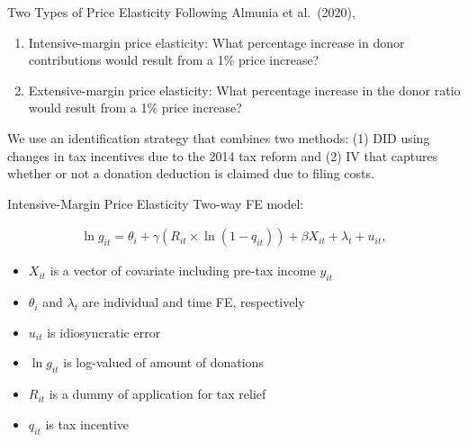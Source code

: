\documentclass[
  ignorenonframetext,
  aspectratio=169,
]{beamer}
\providecommand{\tightlist}{%
  \setlength{\itemsep}{0pt}\setlength{\parskip}{0pt}}
\begin{document}
\begin{frame}{Two Types of Price Elasticity}
\protect\hypertarget{two-types-of-price-elasticity}{}
Following Almunia et al.~(2020),

\begin{enumerate}
\tightlist
\item
  Intensive-margin price elasticity: What percentage increase in donor contributions would result from a 1\% price increase?
\item
  Extensive-margin price elasticity: What percentage increase in the donor ratio would result from a 1\% price increase?
\end{enumerate}

We use an identification strategy that combines two methods:
(1) DID using changes in tax incentives due to the 2014 tax reform and
(2) IV that captures whether or not a donation deduction is claimed due to filing costs.
\end{frame}

\begin{frame}{Intensive-Margin Price Elasticity}
\protect\hypertarget{intensive-margin-price-elasticity}{}
Two-way FE model:

\begin{align}
  \ln g_{it} = \theta_i + \gamma (R_{it} \times \ln (1 - q_{it}))
    + \beta X_{it} + \lambda_t + u_{it}, \label{eq:intensive}
\end{align}

\begin{itemize}
\tightlist
\item
  \(X_{it}\) is a vector of covariate including pre-tax income \(y_{it}\)
\item
  \(\theta_i\) and \(\lambda_t\) are individual and time FE, respectively
\item
  \(u_{it}\) is idiosyncratic error
\item
  \(\ln g_{it}\) is log-valued of amount of donations
\item
  \(R_{it}\) is a dummy of application for tax relief
\item
  \(q_{it}\) is tax incentive
\end{itemize}
\end{frame}
\end{document}
